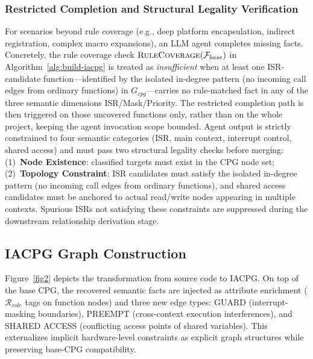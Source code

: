\documentclass[conference]{IEEEtran}
\begin{document}
\subsubsection{Restricted Completion and Structural Legality Verification}

For scenarios beyond rule coverage (e.g., deep platform encapsulation, indirect registration, complex macro expansions), an LLM agent completes missing facts. Concretely, the rule coverage check $\Call{RuleCoverage}{\mathcal{F}_{base}}$ in Algorithm~\ref{alg:build-iacpg} is treated as \emph{insufficient} when at least one ISR-candidate function---identified by the isolated in-degree pattern (no incoming call edges from ordinary functions) in $G_{cpg}$---carries no rule-matched fact in any of the three semantic dimensions ISR/Mask/Priority. The restricted completion path is then triggered on those uncovered functions only, rather than on the whole project, keeping the agent invocation scope bounded. Agent output is strictly constrained to four semantic categories (ISR, main context, interrupt control, shared access) and must pass two structural legality checks before merging: (1)~\textbf{Node Existence}: classified targets must exist in the CPG node set; (2)~\textbf{Topology Constraint}: ISR candidates must satisfy the isolated in-degree pattern (no incoming call edges from ordinary functions), and shared access candidates must be anchored to actual read/write nodes appearing in multiple contexts. Spurious ISRs not satisfying these constraints are suppressed during the downstream relationship derivation stage.

\subsection{IACPG Graph Construction}
  
Figure~\ref{fig2} depicts the transformation from source code to IACPG. On top of the base CPG, the recovered semantic facts are injected as attribute enrichment ($\mathcal{R}_{role}$ tags on function nodes) and three new edge types: GUARD (interrupt-masking boundaries), PREEMPT (cross-context execution interferences), and SHARED ACCESS (conflicting access points of shared variables). This externalizes implicit hardware-level constraints as explicit graph structures while preserving base-CPG compatibility.
\end{document}
